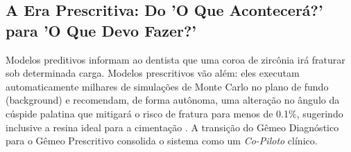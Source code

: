 \subsection{A Era Prescritiva: Do 'O Que Acontecerá?' para 'O Que Devo Fazer?'}

Modelos preditivos informam ao dentista que uma coroa de zircônia irá fraturar sob determinada carga. Modelos prescritivos vão além: eles executam automaticamente milhares de simulações de Monte Carlo no plano de fundo (background) e recomendam, de forma autônoma, uma alteração no ângulo da cúspide palatina que mitigará o risco de fratura para menos de 0.1\%, sugerindo inclusive a resina ideal para a cimentação \cite{menon2026digital}. A transição do Gêmeo Diagnóstico para o Gêmeo Prescritivo consolida o sistema como um \textit{Co-Piloto} clínico.
